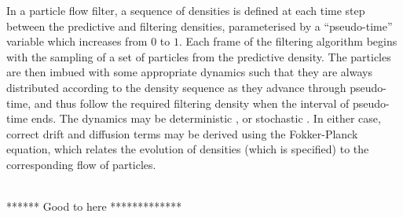 \documentclass{statsoc}
\begin{document}
In a particle flow filter, a sequence of densities is defined at each time step between the predictive and filtering densities, parameterised by a ``pseudo-time'' variable which increases from $0$ to $1$. Each frame of the filtering algorithm begins with the sampling of a set of particles from the predictive density. The particles are then imbued with some appropriate dynamics such that they are always distributed according to the density sequence as they advance through pseudo-time, and thus follow the required filtering density when the interval of pseudo-time ends. The dynamics may be deterministic \citep{Daum2008}, or stochastic \citep{Daum2013,Reich2011}. In either case, correct drift and diffusion terms may be derived using the Fokker-Planck equation, which relates the evolution of densities (which is specified) to the corresponding flow of particles.

{\meta \\****** Good to here *************\\}
\end{document}
